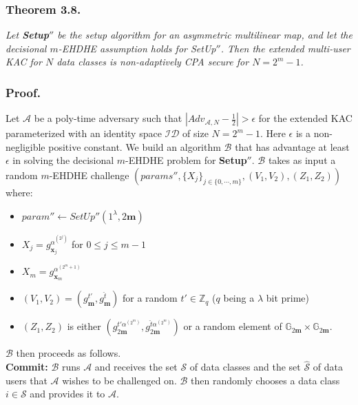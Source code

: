 \subsubsection{Theorem 3.8.} \textit{Let \textbf{Setup}$''$ be the setup algorithm for an asymmetric multilinear map, and let the decisional $m$-EHDHE assumption holds for {SetUp}$''$. Then the extended multi-user KAC for $N$ data classes is non-adaptively CPA secure for $N=2^m-1$.}

\subsubsection{Proof.} Let $\mathcal{A}$ be a poly-time adversary such that $|Adv_{\mathcal{A},N}-\frac{1}{2}| > \epsilon$ for the extended KAC parameterized with an identity space $\mathcal{ID}$ of size $N=2^m-1$. Here $\epsilon$ is a non-negligible positive constant. We build an algorithm $\mathcal{B}$ that has advantage at least $\epsilon$ in solving the decisional $m$-EHDHE problem for \textbf{Setup}$''$. $\mathcal{B}$ takes as input a random $m$-EHDHE challenge $(params'',\{X_j\}_{j\in\{0,\cdots,m\}},(V_1,V_2),(Z_1,Z_2))$ where:
\begin{itemize}
 \item $param''\leftarrow SetUp''(1^{\lambda},2\mathbf{m})$
 \item $X_j=g^{\alpha^{(2^j)}}_{\mathbf{x}_j}$ for $0\leq j \leq m-1$
 \item $X_m=g^{\alpha^{(2^m+1)}}_{\mathbf{x}_m}$
 \item $(V_1,V_2)=\left(g^{t'}_{\mathbf{m}},g^{\hat{t}}_{\mathbf{m}}\right)$ for a random $t'\in\mathbb{Z}_q$ ($q$ being a $\lambda$ bit prime)
 \item $(Z_1,Z_2)$ is either $\left(g^{t'\alpha^{(2^m)}}_{2\mathbf{m}},g^{\hat{t}\alpha^{(2^m)}}_{2\mathbf{m}}\right)$ or a random element of $\mathbb{G}_{2\mathbf{m}}\times\mathbb{G}_{2\mathbf{m}}$.
\end{itemize}
\noindent $\mathcal{B}$ then proceeds as follows.\\

\noindent \textbf{Commit:} $\mathcal{B}$ runs $\mathcal{A}$ and receives the set $\mathcal{S}$ of data classes and the set $\hat{\mathcal{S}}$ of data users that $\mathcal{A}$ wishes to be challenged on. $\mathcal{B}$ then randomly chooses a data class $i\in\mathcal{S}$ and provides it to $\mathcal{A}$.\\
 
